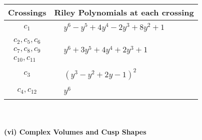 \documentclass[1p]{elsarticle_modified}
\theoremstyle{definition}
\begin{document}
\begin{tabular}{m{50pt}|m{274pt}}
Crossings & \hspace{64pt}Riley Polynomials at each crossing \\
\hline $$\begin{aligned}c_{1}\end{aligned}$$&$\begin{aligned}
&y^6- y^5+4 y^4-2 y^3+8 y^2+1
\end{aligned}$\\
\hline $$\begin{aligned}c_{2},c_{5},c_{6}\\c_{7},c_{8},c_{9}\\c_{10},c_{11}\end{aligned}$$&$\begin{aligned}
&y^6+3 y^5+4 y^4+2 y^3+1
\end{aligned}$\\
\hline $$\begin{aligned}c_{3}\end{aligned}$$&$\begin{aligned}
&(y^3- y^2+2 y-1)^2
\end{aligned}$\\
\hline $$\begin{aligned}c_{4},c_{12}\end{aligned}$$&$\begin{aligned}
&y^6
\end{aligned}$\\
\hline
\end{tabular}\\~\\
\newpage\flushleft \textbf{(vi) Complex Volumes and Cusp Shapes}
\end{document}
